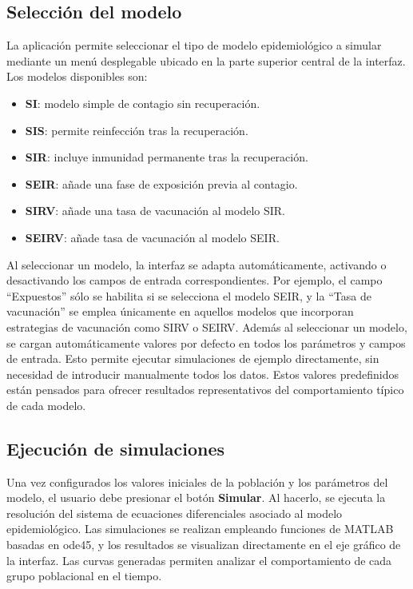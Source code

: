 \subsection{Selección del modelo}

La aplicación permite seleccionar el tipo de modelo epidemiológico a simular mediante un menú desplegable ubicado en la parte superior central de la interfaz. Los modelos disponibles son:

\begin{itemize}
    \item \textbf{SI}: modelo simple de contagio sin recuperación.
    \item \textbf{SIS}: permite reinfección tras la recuperación.
    \item \textbf{SIR}: incluye inmunidad permanente tras la recuperación.
    \item \textbf{SEIR}: añade una fase de exposición previa al contagio.
    \item \textbf{SIRV}: añade una tasa de vacunación al modelo SIR.
    \item \textbf{SEIRV}: añade tasa de vacunación al modelo SEIR.
\end{itemize}

Al seleccionar un modelo, la interfaz se adapta automáticamente, activando o desactivando los campos de entrada correspondientes. Por ejemplo, el campo “Expuestos” sólo se habilita si se selecciona el modelo SEIR, y la “Tasa de vacunación” se emplea únicamente en aquellos modelos que incorporan estrategias de vacunación como SIRV o SEIRV. Además al seleccionar un modelo, se cargan automáticamente valores por defecto en todos los parámetros y campos de entrada. Esto permite ejecutar simulaciones de ejemplo directamente, sin necesidad de introducir manualmente todos los datos. Estos valores predefinidos están pensados para ofrecer resultados representativos del comportamiento típico de cada modelo.


\subsection{Ejecución de simulaciones}

Una vez configurados los valores iniciales de la población y los parámetros del modelo, el usuario debe presionar el botón \textbf{Simular}. Al hacerlo, se ejecuta la resolución del sistema de ecuaciones diferenciales asociado al modelo epidemiológico. Las simulaciones se realizan empleando funciones de MATLAB basadas en ode45, y los resultados se visualizan directamente en el eje gráfico de la interfaz. Las curvas generadas permiten analizar el comportamiento de cada grupo poblacional en el tiempo.

